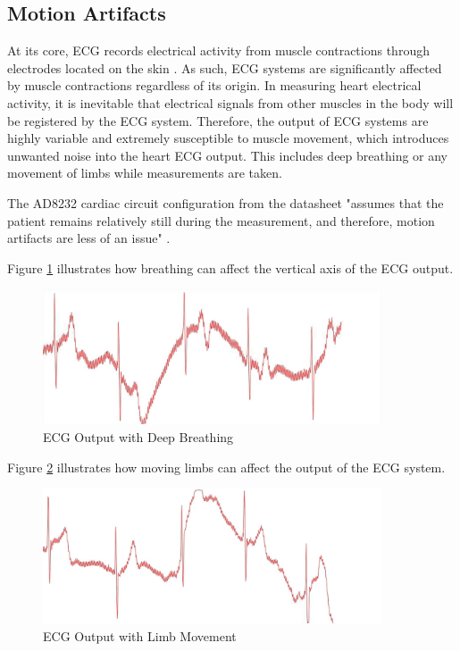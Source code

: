 \subsection{Motion Artifacts} \label{motionartifact}
At its core, ECG records electrical activity from muscle contractions through electrodes located on the skin \cite{ashley2004conquering}. As such, ECG systems are significantly affected by muscle contractions regardless of its origin. In measuring heart electrical activity, it is inevitable that electrical signals from other muscles in the body will be registered by the ECG system. Therefore, the output of ECG systems are highly variable and extremely susceptible to muscle movement, which introduces unwanted noise into the heart ECG output. This includes deep breathing or any movement of limbs while measurements are taken. 

The AD8232 cardiac circuit configuration from the datasheet "assumes that the patient remains relatively still during the measurement, and therefore, motion artifacts are less of an issue" \cite{ad8232datasheet}.

Figure \ref{ecgbreathing} illustrates how breathing can affect the vertical axis of the ECG output. 

\begin{figure}[H]
	\centering
	\includegraphics[width=\linewidth,height=40mm,frame]{ecgtest12.jpg}
	\caption{ECG Output with Deep Breathing}
	\label{ecgbreathing}
\end{figure} 

Figure \ref{ecgmovement} illustrates how moving limbs can affect the output of the ECG system. 

\begin{figure}[H]
	\centering
	\includegraphics[width=\linewidth,height=40mm,frame]{ecgtest7.jpg}
	\caption{ECG Output with Limb Movement}
	\label{ecgmovement}
\end{figure} 

